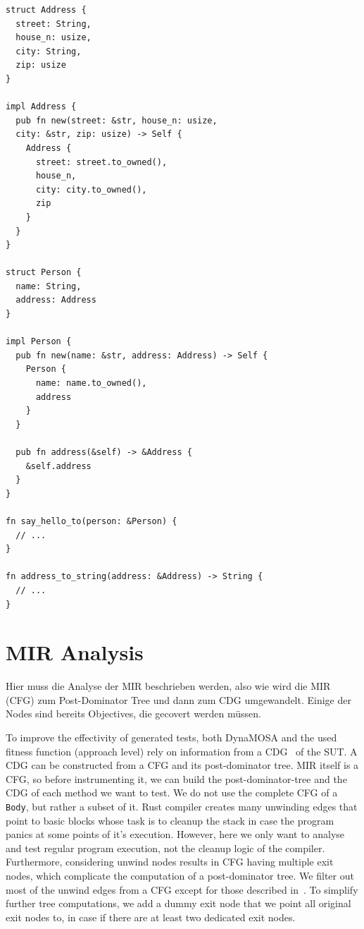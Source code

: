 \documentclass[paper=a4,%
  twoside,%
  BCOR4mm,%
  abstract=true,%
  toc=bibliography,%
  chapterprefix=true,%
  toc=bibliographynumbered,%
  open=right,%
  english,%
  pagesize=pdftex]{scrreprt}
\newcommand{\mir}{\ac{MIR}\xspace}
\newcommand{\cfg}{\ac{CFG}\xspace}
\begin{document}
\begin{lstlisting}[style=boxed, caption={After HIR analysis, we know how a \texttt{Person} object can be generated to be used in \texttt{say\string_hello\string_to}.}, label=lst:hir-analysis-example]
struct Address {
  street: String,
  house_n: usize,
  city: String,
  zip: usize
}

impl Address {
  pub fn new(street: &str, house_n: usize,
  city: &str, zip: usize) -> Self {
    Address {
      street: street.to_owned(),
      house_n,
      city: city.to_owned(),
      zip
    }
  }
}

struct Person {
  name: String,
  address: Address
}

impl Person {
  pub fn new(name: &str, address: Address) -> Self {
    Person {
      name: name.to_owned(),
      address
    }
  }

  pub fn address(&self) -> &Address {
    &self.address
  }
}

fn say_hello_to(person: &Person) {
  // ...
}

fn address_to_string(address: &Address) -> String {
  // ...
}
\end{lstlisting}

\section{MIR Analysis}
Hier muss die Analyse der MIR beschrieben werden, also wie wird die MIR (CFG) zum Post-Dominator Tree und dann zum CDG umgewandelt. Einige der Nodes sind bereits Objectives, die gecovert werden müssen.

To improve the effectivity of generated tests, both DynaMOSA and the used fitness function (approach level) rely on information from a \ac{CDG}~\cite{Ferrante1987} of the \ac{SUT}. A \ac{CDG} can be constructed from a \cfg and its post-dominator tree. \mir itself is a \cfg, so before instrumenting it, we can build the post-dominator-tree and the \ac{CDG} of each method we want to test. We do not use the complete \cfg of a \texttt{Body}, but rather a subset of it. Rust compiler creates many unwinding edges that point to basic blocks whose task is to cleanup the stack in case the program panics at some points of it's execution. However, here we only want to analyse and test regular program execution, not the cleanup logic of the compiler. Furthermore, considering unwind nodes results in \cfg having multiple exit nodes, which complicate the computation of a post-dominator tree. We filter out most of the unwind edges from a \cfg except for those described in~. To simplify further tree computations, we add a dummy exit node that we point all original exit nodes to, in case if there are at least two dedicated exit nodes. 
\end{document}
